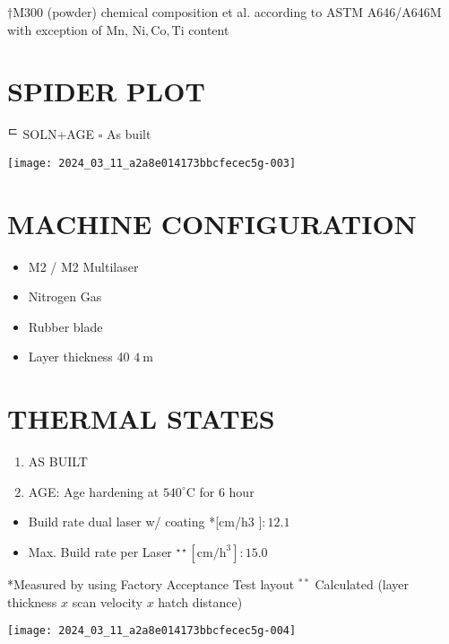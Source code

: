 \documentclass[10pt]{article}
\begin{document}
†M300 (powder) chemical composition et al. according to ASTM A646/A646M with exception of Mn, $\mathrm{Ni}, \mathrm{Co}, \mathrm{Ti}$ content

\section*{SPIDER PLOT}
ᄃ SOLN+AGE $\square$ As built

\begin{center}
\texttt{[image: 2024\_03\_11\_a2a8e014173bbcfecec5g-003]}
\end{center}

\section*{MACHINE CONFIGURATION}
\begin{itemize}
  \item M2 / M2 Multilaser

  \item Nitrogen Gas

  \item Rubber blade

  \item Layer thickness 40 $4 \mathrm{~m}$

\end{itemize}

\section*{THERMAL STATES}
\begin{enumerate}
  \item AS BUILT

  \item AGE: Age hardening at $540^{\circ} \mathrm{C}$ for 6 hour

\end{enumerate}

\begin{itemize}
  \item Build rate dual laser w/ coating *[cm/h3 $]: 12.1$
  \item Max. Build rate per Laser ${ }^{\star \star}\left[\mathrm{cm} / \mathrm{h}^{3}\right]: 15.0$
\end{itemize}

*Measured by using Factory Acceptance Test layout ${ }^{* *}$ Calculated (layer thickness $x$ scan velocity $x$ hatch distance)

\begin{center}
\texttt{[image: 2024\_03\_11\_a2a8e014173bbcfecec5g-004]}
\end{center}
\end{document}
